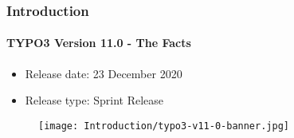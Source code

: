 %

\begin{frame}[fragile]
	\frametitle{Introduction}
	\framesubtitle{TYPO3 Version 11.0 - The Facts}

	\begin{itemize}
		\item Release date: 23 December 2020
		\item Release type: Sprint Release
	\end{itemize}

	\begin{figure}
		\texttt{[image: Introduction/typo3-v11-0-banner.jpg]}
	\end{figure}

\end{frame}

